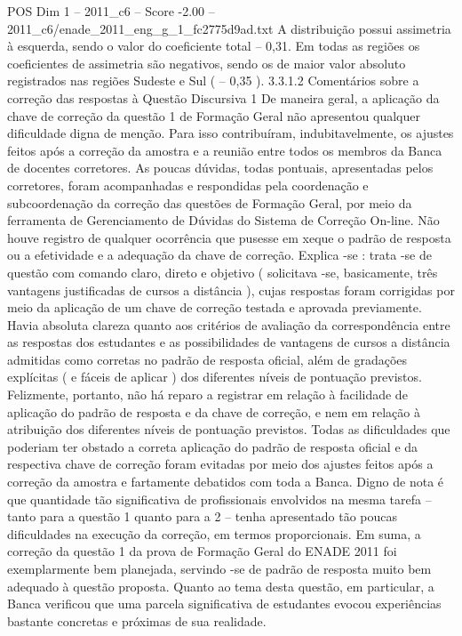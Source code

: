 \begin{textsample}{POS Dim 1 – 2011\_c6 – Score -2.00 – 2011\_c6/enade\_2011\_eng\_g\_1\_fc2775d9ad.txt}
A distribuição possui assimetria à esquerda, sendo o valor do coeficiente total – 0,31.
Em todas as regiões os coeficientes de assimetria são negativos, sendo os de maior valor absoluto registrados nas regiões Sudeste e Sul ( – 0,35 ). 3.3.1.2 Comentários sobre a correção das respostas à Questão Discursiva 1 De maneira geral, a aplicação da chave de correção da questão 1 de Formação Geral não apresentou qualquer dificuldade digna de menção.
Para isso contribuíram, indubitavelmente, os ajustes feitos após a correção da amostra e a reunião entre todos os membros da Banca de docentes corretores.
As poucas dúvidas, todas pontuais, apresentadas pelos corretores, foram acompanhadas e respondidas pela coordenação e subcoordenação da correção das questões de Formação Geral, por meio da ferramenta de Gerenciamento de Dúvidas do Sistema de Correção On-line.
Não houve registro de qualquer ocorrência que pusesse em xeque o padrão de resposta ou a efetividade e a adequação da chave de correção.
Explica -se : trata -se de questão com comando claro, direto e objetivo ( solicitava -se, basicamente, três vantagens justificadas de cursos a distância ), cujas respostas foram corrigidas por meio da aplicação de um chave de correção testada e aprovada previamente.
Havia absoluta clareza quanto aos critérios de avaliação da correspondência entre as respostas dos estudantes e as possibilidades de vantagens de cursos a distância admitidas como corretas no padrão de resposta oficial, além de gradações explícitas ( e fáceis de aplicar ) dos diferentes níveis de pontuação previstos.
Felizmente, portanto, não há reparo a registrar em relação à facilidade de aplicação do padrão de resposta e da chave de correção, e nem em relação à atribuição dos diferentes níveis de pontuação previstos.
Todas as dificuldades que poderiam ter obstado a correta aplicação do padrão de resposta oficial e da respectiva chave de correção foram evitadas por meio dos ajustes feitos após a correção da amostra e fartamente debatidos com toda a Banca.
Digno de nota é que quantidade tão significativa de profissionais envolvidos na mesma tarefa – tanto para a questão 1 quanto para a 2 – tenha apresentado tão poucas dificuldades na execução da correção, em termos proporcionais.
Em suma, a correção da questão 1 da prova de Formação Geral do ENADE 2011 foi exemplarmente bem planejada, servindo -se de padrão de resposta muito bem adequado à questão proposta.
Quanto ao tema desta questão, em particular, a Banca verificou que uma parcela significativa de estudantes evocou experiências bastante concretas e próximas de sua realidade.

\end{textsample}
